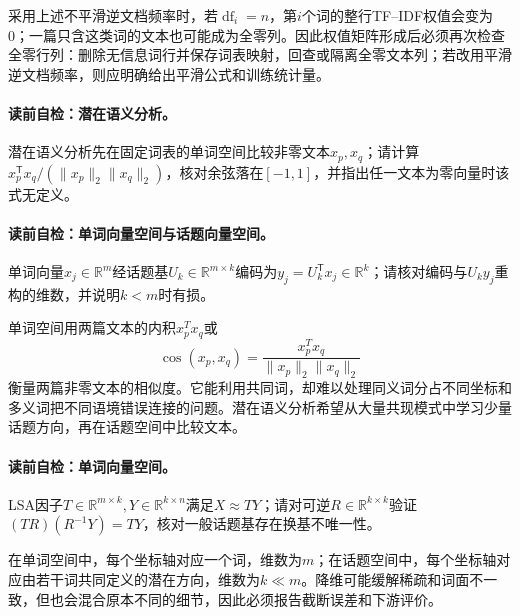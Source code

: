 采用上述不平滑逆文档频率时，若$\operatorname{df}_i=n$，第$i$个词的整行TF--IDF权值会变为0；一篇只含这类词的文本也可能成为全零列。因此权值矩阵形成后必须再次检查全零行列：删除无信息词行并保存词表映射，回查或隔离全零文本列；若改用平滑逆文档频率，则应明确给出平滑公式和训练统计量。

\paragraph{读前自检：潜在语义分析。}潜在语义分析先在固定词表的单词空间比较非零文本$x_p,x_q$；请计算$x_p^{\mathsf T}x_q/(\lVert x_p\rVert_2\lVert x_q\rVert_2)$，核对余弦落在$[-1,1]$，并指出任一文本为零向量时该式无定义。\par
\paragraph{读前自检：单词向量空间与话题向量空间。}单词向量$x_j\in\mathbb R^m$经话题基$U_k\in\mathbb R^{m\times k}$编码为$y_j=U_k^{\mathsf T}x_j\in\mathbb R^k$；请核对编码与$U_ky_j$重构的维数，并说明$k<m$时有损。\par

单词空间用两篇文本的内积$x_p^Tx_q$或
\[
\cos(x_p,x_q)=\frac{x_p^Tx_q}{\|x_p\|_2\|x_q\|_2}
\]
衡量两篇非零文本的相似度。它能利用共同词，却难以处理同义词分占不同坐标和多义词把不同语境错误连接的问题。潜在语义分析希望从大量共现模式中学习少量话题方向，再在话题空间中比较文本。

\paragraph{读前自检：单词向量空间。}LSA因子$T\in\mathbb R^{m\times k},Y\in\mathbb R^{k\times n}$满足$X\approx TY$；请对可逆$R\in\mathbb R^{k\times k}$验证$(TR)(R^{-1}Y)=TY$，核对一般话题基存在换基不唯一性。\par

在单词空间中，每个坐标轴对应一个词，维数为$m$；在话题空间中，每个坐标轴对应由若干词共同定义的潜在方向，维数为$k\ll m$。降维可能缓解稀疏和词面不一致，但也会混合原本不同的细节，因此必须报告截断误差和下游评价。

\label{struct:V4-C05-CH07}


